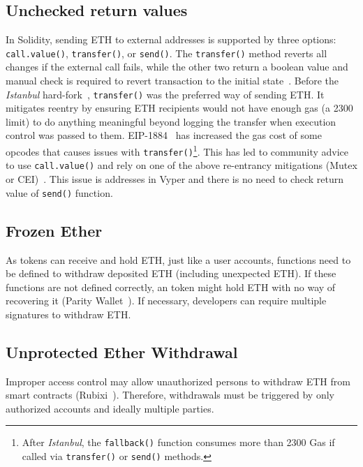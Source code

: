 \subsection{Unchecked return values}\label{subsec:urv}
In Solidity, sending ETH to external addresses is supported by three options: \texttt{call.value()}, \texttt{transfer()}, or \texttt{send()}. The \texttt{transfer()} method reverts all changes if the external call fails, while the other two return a boolean value and manual check is required to revert transaction to the initial state~\cite{SoliditySendEther}. Before the \textit{Istanbul} hard-fork~\cite{IstanbulUpgrades}, \texttt{transfer()} was the preferred way of sending ETH. It mitigates reentry by ensuring ETH recipients would not have enough gas (\ie a 2300 limit) to do anything meaningful beyond logging the transfer when execution control was passed to them. EIP-1884~\cite{EIP1884} has increased the gas cost of some opcodes that causes issues with \texttt{transfer()}\footnote{After \textit{Istanbul}, the \texttt{fallback()} function consumes more than 2300 Gas if called via \texttt{transfer()} or \texttt{send()} methods.}. This has led to community advice to use \texttt{call.value()} and rely on one of the above re-entrancy mitigations (\ie Mutex or CEI)~\cite{WiKiMutex,CEI}. This issue is addresses in Vyper and there is no need to check return value of \texttt{send()} function.

\subsection{Frozen Ether}\label{subsec:feth}
As \erc tokens can receive and hold ETH, just like a user accounts, functions need to be defined to withdraw deposited ETH (including unexpected ETH). If these functions are not defined correctly, an \erc token might hold ETH with no way of recovering it (\cf Parity Wallet~\cite{ParityWalletHack}). If necessary, developers can require multiple signatures to withdraw ETH.

\subsection{Unprotected Ether Withdrawal}\label{subsec:uew}
Improper access control may allow unauthorized persons to withdraw ETH from smart contracts (\cf Rubixi~\cite{Rubixi}). Therefore, withdrawals must be triggered by only authorized accounts and ideally multiple parties.

